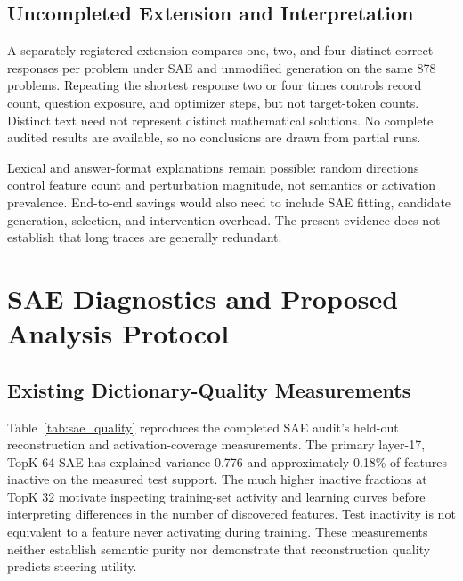 \subsection{Uncompleted Extension and Interpretation}
\label{app:scope}

A separately registered extension compares one, two, and four distinct correct responses per problem under SAE and unmodified generation on the same 878 problems.
Repeating the shortest response two or four times controls record count, question exposure, and optimizer steps, but not target-token counts.
Distinct text need not represent distinct mathematical solutions.
No complete audited results are available, so no conclusions are drawn from partial runs.

Lexical and answer-format explanations remain possible: random directions control feature count and perturbation magnitude, not semantics or activation prevalence.
End-to-end savings would also need to include SAE fitting, candidate generation, selection, and intervention overhead.
The present evidence does not establish that long traces are generally redundant.

\section{SAE Diagnostics and Proposed Analysis Protocol}
\label{app:sae_protocol}

\subsection{Existing Dictionary-Quality Measurements}
\label{app:sae_quality}

Table~\ref{tab:sae_quality} reproduces the completed SAE audit's held-out reconstruction and activation-coverage measurements.
The primary layer-17, TopK-64 SAE has explained variance 0.776 and approximately 0.18\% of features inactive on the measured test support.
The much higher inactive fractions at TopK 32 motivate inspecting training-set activity and learning curves before interpreting differences in the number of discovered features.
Test inactivity is not equivalent to a feature never activating during training.
These measurements neither establish semantic purity nor demonstrate that reconstruction quality predicts steering utility.

